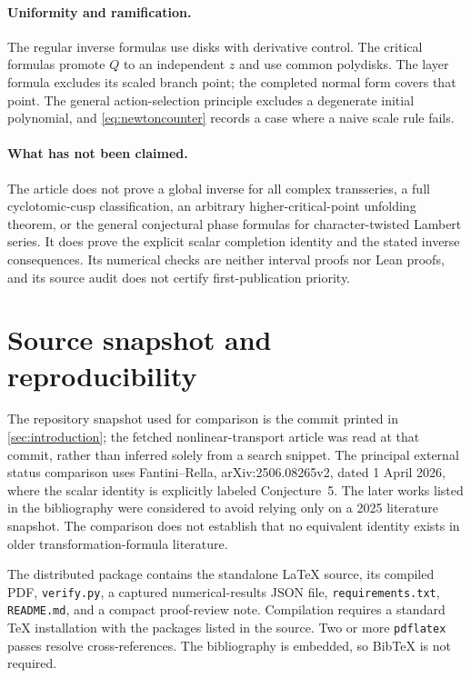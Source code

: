 \documentclass[11pt,a4paper]{article}
\numberwithin{equation}{section}
\theoremstyle{definition}
\theoremstyle{remark}
\begin{document}
\paragraph{Uniformity and ramification.}
The regular inverse formulas use disks with derivative control. The
critical formulas promote $Q$ to an independent $z$ and use common
polydisks. The layer formula excludes its scaled branch point; the
completed normal form covers that point. The general action-selection
principle excludes a degenerate initial polynomial, and
\eqref{eq:newtoncounter} records a case where a naive scale rule fails.

\paragraph{What has not been claimed.}
The article does not prove a global inverse for all complex
transseries, a full cyclotomic-cusp classification, an arbitrary
higher-critical-point unfolding theorem, or the general conjectural
phase formulas for character-twisted Lambert series. It does prove
the explicit scalar completion identity and the stated inverse
consequences. Its numerical checks are neither interval proofs nor
Lean proofs, and its source audit does not certify first-publication
priority.

\section{Source snapshot and reproducibility}
\label{app:source}
The repository snapshot used for comparison is the commit printed in
\cref{sec:introduction}; the fetched nonlinear-transport article was
read at that commit, rather than inferred solely from a search
snippet. The principal external status comparison uses
Fantini--Rella, arXiv:2506.08265v2, dated 1 April 2026, where the scalar
identity is explicitly labeled Conjecture~5. The later works listed
in the bibliography were considered to avoid relying only on a 2025
literature snapshot. The comparison does not establish that no
equivalent identity exists in older transformation-formula literature.

The distributed package contains the standalone \LaTeX{} source,
its compiled PDF, \texttt{verify.py}, a captured numerical-results
JSON file, \texttt{requirements.txt}, \texttt{README.md}, and a compact
proof-review note. Compilation requires a standard \TeX{} installation
with the packages listed in the source. Two or more \texttt{pdflatex}
passes resolve cross-references. The bibliography is embedded, so
Bib\TeX{} is not required.
\end{document}
